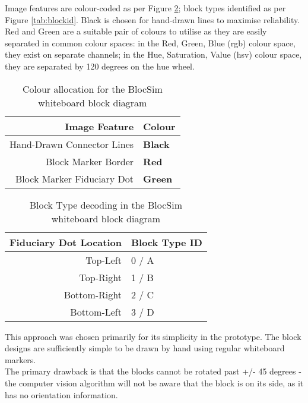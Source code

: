 Image features are colour-coded as per Figure \ref{tab:color}; block types identified as per Figure \ref{tab:blockid}. Black is chosen for hand-drawn lines to maximise reliability. Red and Green are a suitable pair of colours to utilise as they are easily separated in common colour spaces: in the Red, Green, Blue (\gls{rgb}) colour space, they exist on separate channels; in the Hue, Saturation, Value (\gls{hsv}) colour space, they are separated by 120 degrees on the hue wheel.

\begin{table}[ht!]
	\center
	\begin{tabular}{r l} %
		\hline
		\rowstyle{\bfseries}
		Image Feature & Colour \\
		\hline
		Hand-Drawn Connector Lines & \textbf{Black} \\
		Block Marker Border & \textbf{Red} \\
		Block Marker Fiduciary Dot & \textbf{Green} \\
		\hline
	\end{tabular}
	\caption{Colour allocation for the BlocSim whiteboard block diagram}
	\label{tab:color}
\end{table} 
\begin{table}[ht!]
	\center
	\begin{tabular}{r l} %
		\hline
		\rowstyle{\bfseries}
		Fiduciary Dot Location & Block Type ID \\
		\hline
		Top-Left & 0 / A \\
		Top-Right & 1 / B \\
		Bottom-Right & 2 / C \\
		Bottom-Left & 3 / D \\
		\hline
	\end{tabular}
	\caption{Block Type decoding in the BlocSim whiteboard block diagram}
	\label{tab:color}
\end{table} 
\vspace{0.5 cm}

This approach was chosen primarily for its simplicity in the prototype. The block designs are sufficiently simple to be drawn by hand using regular whiteboard markers.
\\

The primary drawback is that the blocks cannot be rotated past +/- 45 degrees - the computer vision algorithm will not be aware that the block is on its side, as it has no orientation information.


